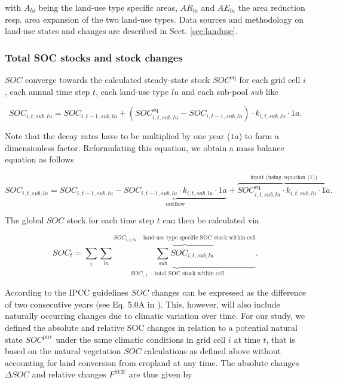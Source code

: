 \documentclass[gc, manuscript]{copernicus}
\begin{document}
with \(A_{lu}\) being the land-use type specific areas, \(AR_{lu}\) and \(AE_{lu}\) the area reduction resp. area expansion of the two land-use types. Data sources and methodology on land-use states and changes are described in Sect. \ref{sec:landuse}.

\hypertarget{sec:totalsoc}{%
\subsubsection{Total SOC stocks and stock changes}\label{sec:totalsoc}}

\(SOC\) converge towards the calculated steady-state stock \(SOC^{\mathrm{eq}}\) for each grid cell \(i\), each annual time step \(t\), each land-use type \(lu\) and each sub-pool \(sub\) like

\begin{equation}
SOC_{i,t,sub,lu} = SOC_{i,t-1,sub,lu} + (SOC^{\mathrm{eq}}_{i,t,sub,lu} - SOC_{i,t-1,sub,lu}) \cdot k_{i,t,sub,lu} \cdot 1\unit{a}.
\label{eq:SOCstate}
\end{equation}

Note that the decay rates have to be multiplied by one year (\(1a\)) to form a dimensionless factor.
Reformulating this equation, we obtain a mass balance equation as follows

\begin{equation}
SOC_{i,t,sub,lu} = SOC_{i,t-1,sub,lu} - \underbrace{SOC_{i,t-1,sub,lu} \cdot k_{i,t,sub,lu} \cdot 1\unit{a}}_{\text{outflow}} + \overbrace{SOC^{\mathrm{eq}}_{i,t,sub,lu} \cdot k_{i,t,sub,lu} \cdot 1\unit{a}}^{\text{input (using equation (1))}}.
\label{eq:steadystate2budget}
\end{equation}

The global \(SOC\) stock for each time step \(t\) can then be calculated via

\begin{equation}
SOC_{t} = \sum_{i} \underbrace{\sum_{lu} \overbrace{\sum_{sub} SOC_{i,t,sub,lu}}^{\text{$SOC_{i,t,lu}$ -- land-use type specific SOC stock within cell}}}_{\text{$SOC_{i,t}$ -- total SOC stock within cell}}.
\label{eq:totalstock}
\end{equation}

According to the IPCC guidelines \(SOC\) changes can be expressed as the difference of two consecutive years (see Eq. 5.0A in \citep{calvo_buendia_ipcc_2019}). This, however, will also include naturally occurring changes due to climatic variation over time. For our study, we defined the absolute and relative SOC changes in relation to a potential natural state \(SOC^{\mathrm{pnv}}\) under the same climatic conditions in grid cell \(i\) at time \(t\), that is based on the natural vegetation \(SOC\) calculations as defined above without accounting for land conversion from cropland at any time. The absolute changes \(\Delta SOC\) and relative changes \(F^{\mathrm{SCF}}\) are thus given by
\end{document}
